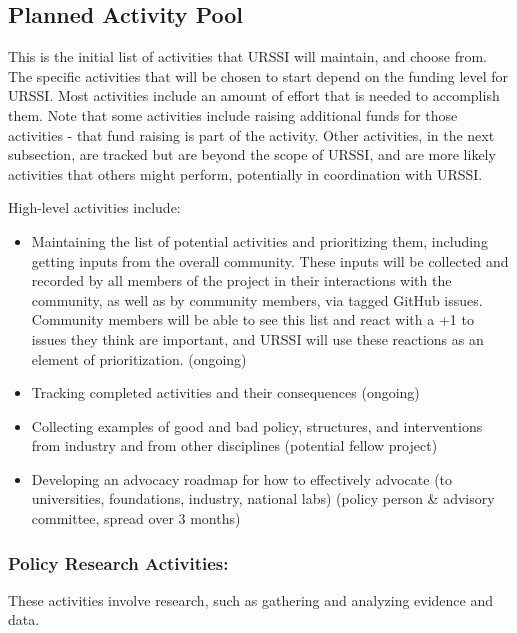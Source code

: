 \documentclass[
]{book}
\begin{document}
\hypertarget{planned-activity-pool}{%
\subsection{Planned Activity Pool}\label{planned-activity-pool}}

This is the initial list of activities that URSSI will maintain, and choose from. The specific
activities that will be chosen to start depend on the funding level for URSSI. Most activities
include an amount of effort that is needed to accomplish them. Note that some activities include
raising additional funds for those activities - that fund raising is part of the activity. Other
activities, in the next subsection, are tracked but are beyond the scope of URSSI, and are more
likely activities that others might perform, potentially in coordination with URSSI.

High-level activities include:

\begin{itemize}
\item
  Maintaining the list of potential activities and prioritizing them, including getting inputs
  from the overall community. These inputs will be collected and recorded by all members of the
  project in their interactions with the community, as well as by community members, via tagged
  GitHub issues. Community members will be able to see this list and react with a +1 to issues
  they think are important, and URSSI will use these reactions as an element of prioritization. (ongoing)
\item
  Tracking completed activities and their consequences (ongoing)
\item
  Collecting examples of good and bad policy, structures, and interventions from industry and
  from other disciplines (potential fellow project)
\item
  Developing an advocacy roadmap for how to effectively advocate (to universities, foundations,
  industry, national labs) (policy person \& advisory committee, spread over 3 months)
\end{itemize}

\hypertarget{policy-research-activities}{%
\subsubsection{Policy Research Activities:}\label{policy-research-activities}}

These activities involve research, such as gathering and analyzing evidence and data.
\end{document}
